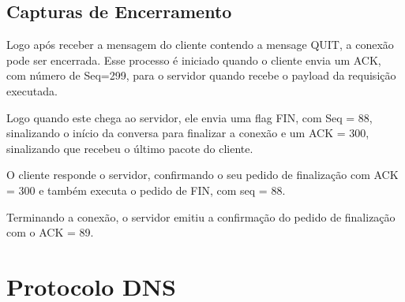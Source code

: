 \subsection{Capturas de Encerramento}
Logo após receber a mensagem do cliente  contendo a mensage QUIT, a conexão pode ser encerrada.
 Esse processo é iniciado quando o cliente envia um ACK, com número de Seq=299, para o servidor
  quando recebe o payload da requisição executada.

Logo quando este chega ao servidor, ele envia uma flag FIN, com Seq = 88, sinalizando o início
 da conversa para finalizar a conexão e um ACK = 300, sinalizando que recebeu o último
  pacote do cliente.

O cliente responde o servidor, confirmando o seu pedido de finalização com ACK = 300 e
também executa o pedido de FIN, com seq = 88.

Terminando a conexão, o servidor emitiu a confirmação do pedido de finalização com o ACK = 89.

\section{Protocolo DNS}
